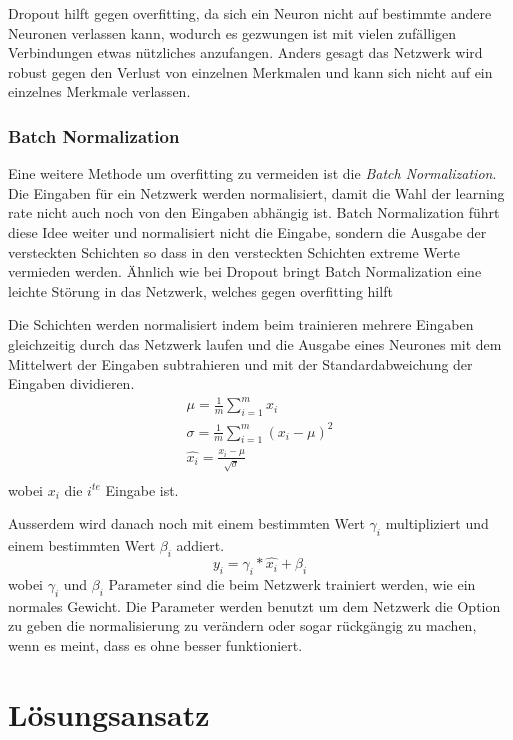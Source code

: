 \documentclass[12pt,a4paper]{report}
\begin{document}
Dropout hilft gegen overfitting,
da sich ein Neuron nicht auf bestimmte andere Neuronen verlassen kann,
wodurch es gezwungen ist mit vielen zufälligen Verbindungen etwas nützliches anzufangen.
Anders gesagt das Netzwerk wird robust gegen den Verlust von einzelnen Merkmalen und kann sich nicht auf ein einzelnes Merkmale verlassen.

\subsection{Batch Normalization}
Eine weitere Methode um overfitting zu vermeiden ist die \textit{Batch Normalization}.
Die Eingaben für ein Netzwerk werden normalisiert,
damit die Wahl der learning rate nicht auch noch von den Eingaben abhängig ist.
Batch Normalization führt diese Idee weiter und normalisiert nicht die Eingabe,
sondern die Ausgabe der versteckten Schichten
so dass in den versteckten Schichten extreme Werte vermieden werden.\cite{batchnorm}
Ähnlich wie bei Dropout bringt Batch Normalization eine leichte Störung in das Netzwerk,
welches gegen overfitting hilft\cite{batchnorm}

Die Schichten werden normalisiert indem beim trainieren mehrere Eingaben gleichzeitig durch das Netzwerk laufen und
die Ausgabe eines Neurones mit dem Mittelwert der Eingaben subtrahieren und mit der Standardabweichung der Eingaben dividieren.\cite{batchnorm}
\begin{gather*}
    \mu = \frac{1}{m}\sum^m_{i=1}x_{i}\\
    \sigma = \frac{1}{m}\sum^m_{i=1}(x_i - \mu)^2\\
    \hat{x_i} = \frac{x_i - \mu}{\sqrt{\sigma}}\\
\end{gather*}
wobei $x_i$ die $i^{te}$ Eingabe ist.

Ausserdem wird danach noch mit einem bestimmten Wert $\gamma_i$ multipliziert und einem bestimmten Wert $\beta_i$ addiert.
\[y_i = \gamma_i * \hat{x_i} + \beta_i \]
wobei $\gamma_i$ und $\beta_i$ Parameter sind die beim Netzwerk trainiert werden, wie ein normales Gewicht.\cite{batchnorm}
Die Parameter werden benutzt um dem Netzwerk die Option zu geben die normalisierung zu verändern oder sogar rückgängig zu machen, wenn es meint,
dass es ohne besser funktioniert.\cite{batchnorm_paper}

\chapter{Lösungsansatz}
\label{ch:lösungsansatz}
\end{document}

